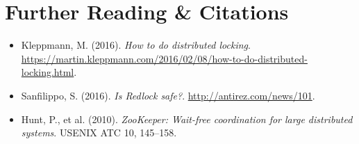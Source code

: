 \section{Further Reading \protect\& Citations}
\begin{itemize}[leftmargin=18pt]
  \item Kleppmann, M. (2016). \emph{How to do distributed locking}. \url{https://martin.kleppmann.com/2016/02/08/how-to-do-distributed-locking.html}.
  \item Sanfilippo, S. (2016). \emph{Is Redlock safe?}. \url{http://antirez.com/news/101}.
  \item Hunt, P., et al. (2010). \emph{ZooKeeper: Wait-free coordination for large distributed systems}. USENIX ATC 10, 145--158.
\end{itemize}

